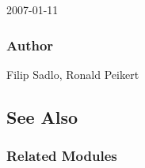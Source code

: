 2007-01-11


\subsubsection{Author}

Filip Sadlo, Ronald Peikert


\subsection{See Also}


\subsubsection{Related Modules}


